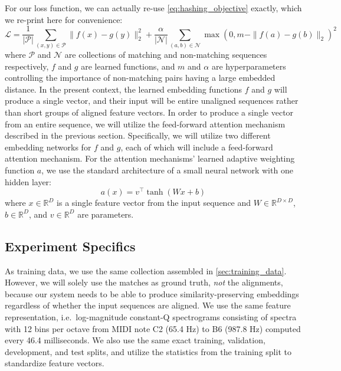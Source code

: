 For our loss function, we can actually re-use \cref{eq:hashing_objective} exactly, which we re-print here for convenience:
\begin{equation}
\mathcal{L} = \frac{1}{|\mathcal{P}|} \sum_{(x, y) \in \mathcal{P}} \| f(x) - g(y) \|_2^2  + \frac{\alpha}{|\mathcal{N}|} \sum_{(a, b) \in \mathcal{N}} \max(0, m - \|f(a) - g(b) \|_2)^2
\label{eq:embedding_objective}
\end{equation}
where $\mathcal{P}$ and $\mathcal{N}$ are collections of matching and non-matching sequences respectively, $f$ and $g$ are learned functions, and $m$ and $\alpha$ are hyperparameters controlling the importance of non-matching pairs having a large embedded distance.
In the present context, the learned embedding functions $f$ and $g$ will produce a single vector, and their input will be entire unaligned sequences rather than short groups of aligned feature vectors.
In order to produce a single vector from an entire sequence, we will utilize the feed-forward attention mechanism described in the previous section.
Specifically, we will utilize two different embedding networks for $f$ and $g$, each of which will include a feed-forward attention mechanism.
For the attention mechanisms' learned adaptive weighting function $a$, we use the standard architecture of a small neural network with one hidden layer:
\begin{equation}
a(x) = v^\top\tanh(Wx + b)
\label{eq:weighting_function}
\end{equation}
where $x \in \mathbb{R}^D$ is a single feature vector from the input sequence and $W \in \mathbb{R}^{D \times D}$, $b \in \mathbb{R}^D$, and $v \in \mathbb{R}^D$ are parameters.

\subsection{Experiment Specifics}
\label{sec:pse_specifics}

As training data, we use the same collection assembled in \cref{sec:training_data}.
However, we will solely use the matches as ground truth, {\em not} the alignments, because our system needs to be able to produce similarity-preserving embeddings regardless of whether the input sequences are aligned.
We use the same feature representation, i.e.\ log-magnitude constant-Q spectrograms consisting of spectra with 12 bins per octave from MIDI note C2 (65.4 Hz) to B6 (987.8 Hz) computed every 46.4 milliseconds.
We also use the same exact training, validation, development, and test splits, and utilize the statistics from the training split to standardize feature vectors.


